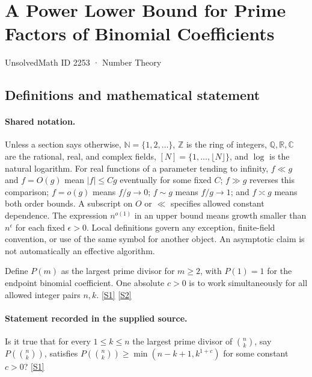 \documentclass[11pt,a4paper]{article}
\newcommand{\N}{\mathbb{N}}
\newcommand{\Z}{\mathbb{Z}}
\newcommand{\Q}{\mathbb{Q}}
\newcommand{\R}{\mathbb{R}}
\newcommand{\C}{\mathbb{C}}
\newcommand{\sref}[2]{\hyperlink{source:#1:#2}{[S#2]}}
\begin{document}

\setcounter{section}{2252}

\section{A Power Lower Bound for Prime Factors of Binomial Coefficients}\label{2253}

{\small\sffamily UnsolvedMath ID 2253 · Number Theory}

\subsection{Definitions and mathematical statement}

\paragraph{Shared notation.}Unless a section says otherwise, $\N=\{1,2,\ldots\}$,
$\Z$ is the ring of integers, $\Q,\R,\C$ are the rational, real, and complex
fields, $[N]=\{1,\ldots,\lfloor N\rfloor\}$, and $\log$ is the natural
logarithm. For real functions of a parameter tending to infinity,
$f\ll g$ and $f=O(g)$ mean $|f|\leq Cg$ eventually for some fixed $C$;
$f\gg g$ reverses this comparison; $f=o(g)$ means $f/g\to0$;
$f\sim g$ means $f/g\to1$; and $f\asymp g$ means both order bounds.
A subscript on $O$ or $\ll$ specifies allowed constant dependence.
The expression $n^{o(1)}$ in an upper bound means growth smaller than
$n^\epsilon$ for each fixed $\epsilon>0$. Local definitions govern any
exception, finite-field convention, or use of the same symbol for another
object. An asymptotic claim is not automatically an effective algorithm.



Define $P(m)$ as the largest prime divisor for $m\geq2$, with $P(1)=1$ for the endpoint binomial coefficient. One absolute $c>0$ is to work simultaneously for all allowed integer pairs $n,k$. \sref{2253}{1} \sref{2253}{2}

\paragraph{Statement recorded in the supplied source.}
Is it true that for every $1\leq k\leq n$ the largest prime divisor of $\binom{n}{k}$, say $P(\binom{n}{k})$, satisfies $ P\left(\binom{n}{k}\right)\geq \min(n-k+1, k^{1+c}) $ for some constant $c>0$? \sref{2253}{1}
\end{document}
